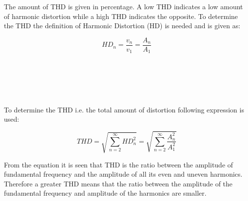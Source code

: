 The amount of THD is given in percentage. A low THD indicates a low amount of harmonic distortion while a high THD indicates the opposite. To determine the THD the definition of Harmonic Distortion (HD) is needed and is given as:

\begin{equation}
H\!D_n = \frac{v_n}{v_1} =\frac{A_n}{A_1}
\end{equation}
\begin{where}
\\
\\
\\
\\
\end{where}

To determine the THD i.e. the total amount of distortion following expression is used:

\begin{equation}
T\!H\!D = \sqrt{\sum_{n=2}^{\infty}H\!D_n^2} = \sqrt{\sum_{n=2}^{\infty}\frac{A_n^2}{A_1^2}}
\end{equation}

From the equation it is seen that THD is the ratio between the amplitude of fundamental frequency and the amplitude of all its even and uneven harmonics. Therefore a greater THD means that the ratio between the amplitude of the fundamental frequency and amplitude of the harmonics are smaller.










